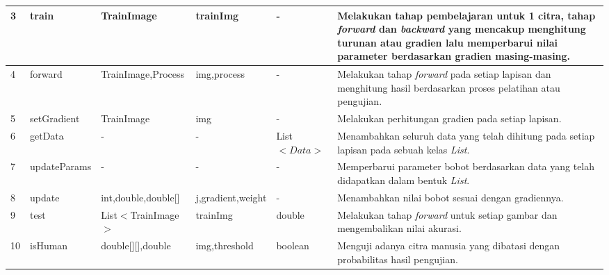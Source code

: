 \begin{small}
\begin{longtable}{|p{0.4cm}|p{2cm}|p{1.8cm}|p{1.8cm}|p{1.7cm}|p{3.55cm}|}
	\hline
	3 & train & TrainImage & trainImg & - & Melakukan tahap pembelajaran untuk 1 citra, tahap \textit{forward} dan \textit{backward} yang mencakup menghitung turunan atau gradien lalu memperbarui nilai parameter berdasarkan gradien masing-masing.\\
	\hline
	4 & forward & TrainImage,\newline Process & img,\newline process & - & Melakukan tahap \textit{forward} pada setiap lapisan dan menghitung hasil berdasarkan proses pelatihan atau pengujian.\\
	\hline
	5 &  setGradient & TrainImage & img & - & Melakukan perhitungan gradien pada setiap lapisan.\\
	\hline
	6 & getData & - & - & List$<Data>$ & Menambahkan seluruh data yang telah dihitung pada setiap lapisan pada sebuah kelas \textit{List}.\\
	\hline
	7 & updateParams & - & - & - & Memperbarui parameter bobot berdasarkan data yang telah didapatkan dalam bentuk \textit{List}.\\
	\hline
	8 & update & int,\newline double,\newline double[] & j,\newline gradient,\newline weight & - & Menambahkan nilai bobot sesuai dengan gradiennya.\\
	\hline
	9 & test & List$<$\newline TrainImage\newline $>$ & trainImg & double & Melakukan tahap \textit{forward} untuk setiap gambar dan mengembalikan nilai akurasi.\\
	\hline
	10 & isHuman & double[][],\newline double & img,\newline threshold & boolean & Menguji adanya citra manusia yang dibatasi dengan probabilitas hasil pengujian.\\
	\hline
\end{longtable}
\end{small}
\endgroup

